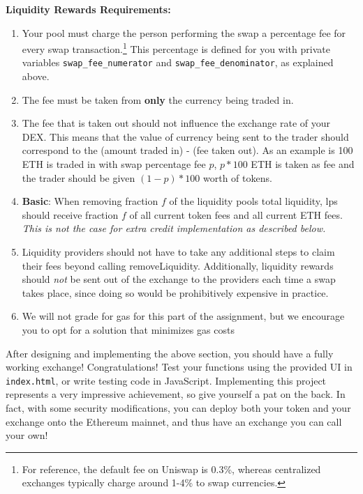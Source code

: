 \documentclass[11pt]{article}
\begin{document}
\textbf{Liquidity Rewards Requirements:}
\begin{enumerate}
    \item Your pool must charge the person performing the swap a percentage fee for every swap transaction.\footnote{For reference, the default fee on Uniswap is 0.3\%, whereas centralized exchanges typically charge around 1-4\% to swap currencies.} This percentage is defined for you with private variables \texttt{swap\_fee\_numerator} and \texttt{swap\_fee\_denominator}, as explained above.
    \item The fee must be taken from \textbf{only} the currency being traded in.
    \item The fee that is taken out should not influence the exchange rate of your DEX. This means that the value of currency being sent to the trader should correspond to the (amount traded in) - (fee taken out). As an example is 100 ETH is traded in with swap percentage fee $p$, $p*100$ ETH is taken as fee and the trader should be given $(1-p)*100$ worth of tokens.
    \item \textbf{Basic}: When removing fraction $f$ of the liquidity pools total liquidity, lps should receive fraction $f$ of all current token fees and all current ETH fees. \textit{This is not the case for extra credit implementation as described below.}
    \item Liquidity providers should not have to take any additional steps to claim their fees beyond calling removeLiquidity. Additionally, liquidity rewards should \textit{not} be sent out of the exchange to the providers each time a swap takes place, since doing so would be prohibitively expensive in practice.
    \item We will not grade for gas for this part of the assignment, but we encourage you to opt for a solution that minimizes gas costs
\end{enumerate}


After designing and implementing the above section, you should have a fully working exchange! Congratulations! Test your functions using the provided UI in \texttt{index.html}, or write testing code in JavaScript. Implementing this project represents a very impressive achievement, so give yourself a pat on the back. In fact, with some security modifications, you can deploy both your token and your exchange onto the Ethereum mainnet, and thus have an exchange you can call your own!
\end{document}
